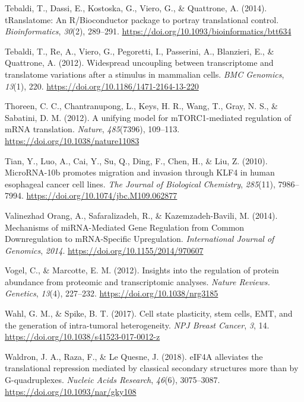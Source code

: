 \documentclass[12pt,openany]{book}
\begin{document}
\hypertarget{ref-Tebaldi2014}{}
Tebaldi, T., Dassi, E., Kostoska, G., Viero, G., \& Quattrone, A.
(2014). tRanslatome: An R/Bioconductor package to portray translational
control. \emph{Bioinformatics}, \emph{30}(2), 289--291.
\url{https://doi.org/10.1093/bioinformatics/btt634}

\hypertarget{ref-Tebaldi2012}{}
Tebaldi, T., Re, A., Viero, G., Pegoretti, I., Passerini, A., Blanzieri,
E., \& Quattrone, A. (2012). Widespread uncoupling between transcriptome
and translatome variations after a stimulus in mammalian cells.
\emph{BMC Genomics}, \emph{13}(1), 220.
\url{https://doi.org/10.1186/1471-2164-13-220}

\hypertarget{ref-Thoreen2012}{}
Thoreen, C. C., Chantranupong, L., Keys, H. R., Wang, T., Gray, N. S.,
\& Sabatini, D. M. (2012). A unifying model for mTORC1-mediated
regulation of mRNA translation. \emph{Nature}, \emph{485}(7396),
109--113. \url{https://doi.org/10.1038/nature11083}

\hypertarget{ref-Tian2010}{}
Tian, Y., Luo, A., Cai, Y., Su, Q., Ding, F., Chen, H., \& Liu, Z.
(2010). MicroRNA-10b promotes migration and invasion through KLF4 in
human esophageal cancer cell lines. \emph{The Journal of Biological
Chemistry}, \emph{285}(11), 7986--7994.
\url{https://doi.org/10.1074/jbc.M109.062877}

\hypertarget{ref-ValinezhadOrang2014}{}
Valinezhad Orang, A., Safaralizadeh, R., \& Kazemzadeh-Bavili, M.
(2014). Mechanisms of miRNA-Mediated Gene Regulation from Common
Downregulation to mRNA-Specific Upregulation. \emph{International
Journal of Genomics}, \emph{2014}.
\url{https://doi.org/10.1155/2014/970607}

\hypertarget{ref-Vogel2012}{}
Vogel, C., \& Marcotte, E. M. (2012). Insights into the regulation of
protein abundance from proteomic and transcriptomic analyses.
\emph{Nature Reviews. Genetics}, \emph{13}(4), 227--232.
\url{https://doi.org/10.1038/nrg3185}

\hypertarget{ref-Wahl2017}{}
Wahl, G. M., \& Spike, B. T. (2017). Cell state plasticity, stem cells,
EMT, and the generation of intra-tumoral heterogeneity. \emph{NPJ Breast
Cancer}, \emph{3}, 14. \url{https://doi.org/10.1038/s41523-017-0012-z}

\hypertarget{ref-Waldron2018}{}
Waldron, J. A., Raza, F., \& Le Quesne, J. (2018). eIF4A alleviates the
translational repression mediated by classical secondary structures more
than by G-quadruplexes. \emph{Nucleic Acids Research}, \emph{46}(6),
3075--3087. \url{https://doi.org/10.1093/nar/gky108}
\end{document}
